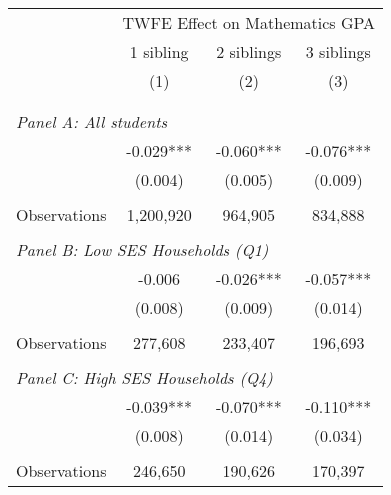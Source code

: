 \makeatletter
{}
{
\makeatother
\begin{tabular}{lccc}
\toprule
\cmidrule(lr){2-4}
& \multicolumn{3}{c}{TWFE Effect on Mathematics GPA} \\
\cmidrule(lr){2-4}
& 1 sibling & 2 siblings & 3 siblings  \\
\cmidrule(lr){2-2} \cmidrule(lr){3-3} \cmidrule(lr){4-4}
& (1) & (2) & (3)\\
\bottomrule
&  &  &  \\
&  &  &   \\
\multicolumn{4}{l}{\textit{Panel A: All students}} \\
\hspace{3mm}        &      -0.029***&      -0.060***&      -0.076***\\
                    &     (0.004)   &     (0.005)   &     (0.009)   \\
                    &               &               &               \\
\hspace{3mm}Observations&   1,200,920   &     964,905   &     834,888   \\
 
&  &  &   \\
\multicolumn{4}{l}{\textit{Panel B: Low SES Households (Q1)}} \\
\hspace{3mm}        &      -0.006   &      -0.026***&      -0.057***\\
                    &     (0.008)   &     (0.009)   &     (0.014)   \\
                    &               &               &               \\
\hspace{3mm}Observations&     277,608   &     233,407   &     196,693   \\
 
&  &  &   \\
\multicolumn{4}{l}{\textit{Panel C: High SES Households (Q4)}} \\
\hspace{3mm}        &      -0.039***&      -0.070***&      -0.110***\\
                    &     (0.008)   &     (0.014)   &     (0.034)   \\
                    &               &               &               \\
\hspace{3mm}Observations&     246,650   &     190,626   &     170,397   \\
 

\end{tabular}}
